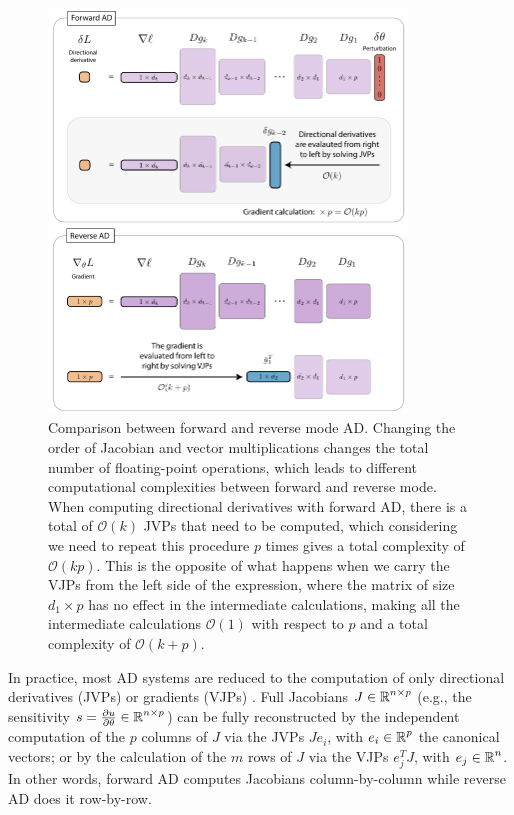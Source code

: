 \begin{figure}[p]
    \centering
    \includegraphics[width=0.85\textwidth]{figures/AD-VJPJVP.pdf}
    \caption{Comparison between forward and reverse mode AD. Changing the order of Jacobian and vector multiplications changes the total number of floating-point operations, which leads to different computational complexities between forward and reverse mode. When computing directional derivatives with forward AD, there is a total of $\mathcal O (k)$ JVPs that need to be computed, which considering we need to repeat this procedure $p$ times gives a total complexity of $\mathcal O (kp)$. This is the opposite of what happens when we carry the VJPs from the left side of the expression, where the matrix of size $d_1 \times p$ has no effect in the intermediate calculations, making all the intermediate calculations $\mathcal O (1)$ with respect to $p$ and a total complexity of $\mathcal O (k + p)$. }
    \label{fig:vjp-jvp}
\end{figure}

In practice, most AD systems are reduced to the computation of only directional derivatives (JVPs) or gradients (VJPs) \cite{Griewank:2008kh}.
Full Jacobians $J \in \operatorname{\mathbb{R}}^{n \times p}$ (e.g., the sensitivity $s = \frac{\partial u}{\partial \theta} \in \operatorname{\mathbb{R}}^{n \times p}$) can be fully reconstructed by the independent computation of the $p$ columns of $J$ via the JVPs $J e_i$, with $e_i \in \operatorname{\mathbb{R}}^p$ the canonical vectors; or by the calculation of the $m$ rows of $J$ via the VJPs $e_j^T J$, with $e_j \in \operatorname{\mathbb{R}}^n$.
In other words, forward AD computes Jacobians column-by-column while reverse AD does it row-by-row.  